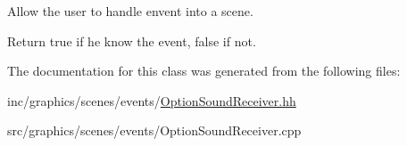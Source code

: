 Allow the user to handle envent into a scene. 

Return true if he know the event, false if not. 

The documentation for this class was generated from the following files\+:\begin{DoxyCompactItemize}
\item 
inc/graphics/scenes/events/\hyperlink{OptionSoundReceiver_8hh}{Option\+Sound\+Receiver.\+hh}\item 
src/graphics/scenes/events/Option\+Sound\+Receiver.\+cpp\end{DoxyCompactItemize}
